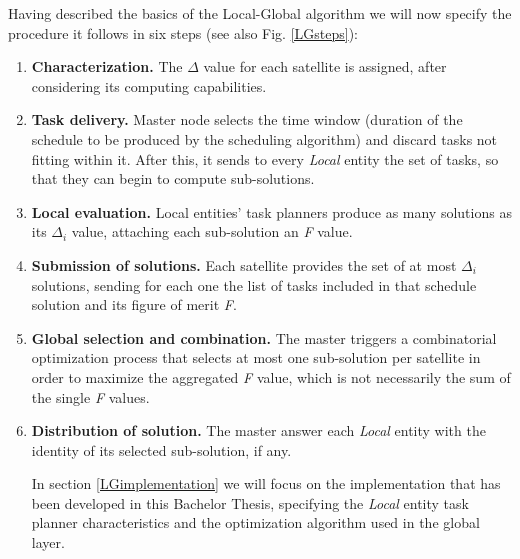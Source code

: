 Having described the basics of the Local-Global algorithm we will now specify the procedure it follows in six steps (see also Fig. \ref{LGsteps}):

\begin{enumerate}
\item \textbf{Characterization.} The $ \Delta $ value for each satellite is assigned, after considering its computing capabilities.
\item \textbf{Task delivery.} Master node selects the time window (duration of the schedule to be produced by the scheduling algorithm) and discard tasks not fitting within it. After this, it sends to every \emph{Local} entity the set of tasks, so that they can begin to compute sub-solutions.
\item \textbf{Local evaluation.} Local entities' task planners produce as many solutions as its $ \Delta_i $ value, attaching each sub-solution an \emph{F} value.
\item \textbf{Submission of solutions.} Each satellite provides the set of at most $ \Delta_i $ solutions, sending for each one the list of tasks included in that schedule solution and its figure of merit \emph{F}.
\item \textbf{Global selection and combination.} The master triggers a combinatorial optimization process that selects at most one sub-solution per satellite in order to maximize the aggregated \emph{F} value, which is not necessarily the sum of the single \emph{F} values.
\item \textbf{Distribution of solution.} The master answer each \emph{Local} entity with the identity of its selected sub-solution, if any.

In section \ref{LGimplementation} we will focus on the implementation that has been developed in this Bachelor Thesis, specifying the \emph{Local} entity task planner characteristics and the optimization algorithm used in the global layer.
\end{enumerate}